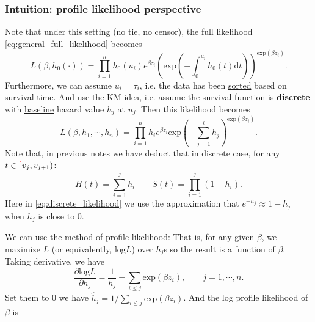 \documentclass[a4paper,12pt]{article}
\begin{document}
\subsubsection{Intuition: profile likelihood perspective}
\label{sec:prof-likel-persp}
Note that under this setting (no tie, no censor), the full likelihood \eqref{eq:general_full_likelihood} becomes
\[
  L\left(\beta, h_0\left(\cdot\right)\right)
  = \prod\limits_{i = 1}^n
  h_0\left(u_i\right)
  e^{\beta z_i}
  \left(
    \mathrm{exp}\left(-\int_0^{u_i}h_0\left(t\right)\mathrm{d}t\right)
  \right)^{\mathrm{exp}\left(\beta z_i\right)}
  .
\]
Furthermore, we can assume $u_i = \tau_i$, i.e. the data has been \underline{sorted} based on survival time. And use the KM idea, i.e. assume the survival function is \textbf{discrete} with \underline{baseline} hazard value $h_j$ at $u_j$. Then this likelihood becomes
\begin{equation}
  \label{eq:discrete_likelihood}
    L\left(\beta, h_1, \cdots, h_n\right)
  = \prod\limits_{i = 1}^n h_i e^{\beta z_i}
  \mathrm{exp}\left(
    - \sum\limits_{j = 1}^i h_j
  \right)^{\mathrm{exp}\left(\beta z_i\right)}
  .
\end{equation}
Note that, in previous notes we have deduct that in discrete case, for any $t\in {\color{red}\left[\right.} v_j, v_{j + 1})$:
\[
  H\left(t\right) = \sum\limits_{i = 1}^j h_i
  \quad\quad
  S\left(t\right) = \prod\limits_{i = 1}^j\left(1 - h_i\right)
  .
\]
Here in \eqref{eq:discrete_likelihood} we use the approximation that $e^{-h_j} \approx 1 - h_j$ when $h_j$ is close to 0.
\par
We can use the method of \underline{profile likelihood}: That is, for any given $\beta$, we maximize $L$ (or equivalently, $\mathrm{log}L$) over $h_j$s so the result is a function of $\beta$. Taking derivative, we have
\[
  \frac{\partial \mathrm{log}L}{\partial h_j}
  = \frac{1}{h_j} - \sum\limits_{i \leq j}\mathrm{exp}\left(\beta z_i\right)
  ,\quad\quad
  j = 1, \cdots, n.
\]
Set them to 0 we have $\hat{h}_j = 1 / \sum\limits_{i \leq j} \mathrm{exp}\left(\beta z_i\right)$. And the \underline{log} profile likelihood of $\beta$ is
\end{document}
